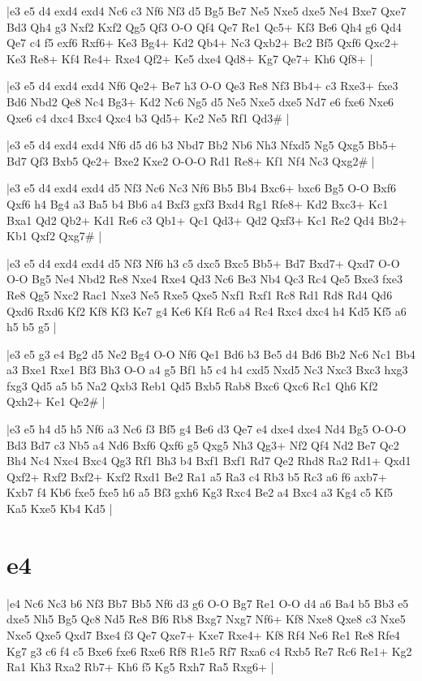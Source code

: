 \whitename{}
\blackname{}
\makegametitle
|e3 e5 d4 exd4 exd4 Nc6 c3 Nf6 Nf3 d5 Bg5 Be7 Ne5 Nxe5 dxe5 Ne4 Bxe7 Qxe7 Bd3 Qh4 g3 Nxf2 Kxf2 Qg5 Qf3 O-O Qf4 Qe7 Re1 Qc5+ Kf3 Be6 Qh4 g6 Qd4 Qe7 c4 f5 exf6 Rxf6+ Ke3 Bg4+ Kd2 Qb4+ Nc3 Qxb2+ Bc2 Bf5 Qxf6 Qxc2+ Ke3 Re8+ Kf4 Re4+ Rxe4 Qf2+ Ke5 dxe4 Qd8+ Kg7 Qe7+ Kh6 Qf8+  |

\whitename{}
\blackname{}
\makegametitle
|e3 e5 d4 exd4 exd4 Nf6 Qe2+ Be7 h3 O-O Qe3 Re8 Nf3 Bb4+ c3 Rxe3+ fxe3 Bd6 Nbd2 Qe8 Nc4 Bg3+ Kd2 Nc6 Ng5 d5 Ne5 Nxe5 dxe5 Nd7 e6 fxe6 Nxe6 Qxe6 c4 dxc4 Bxc4 Qxc4 b3 Qd5+ Ke2 Ne5 Rf1 Qd3\#  |

\whitename{}
\blackname{}
\makegametitle
|e3 e5 d4 exd4 exd4 Nf6 d5 d6 b3 Nbd7 Bb2 Nb6 Nh3 Nfxd5 Ng5 Qxg5 Bb5+ Bd7 Qf3 Bxb5 Qe2+ Bxe2 Kxe2 O-O-O Rd1 Re8+ Kf1 Nf4 Nc3 Qxg2\#  |

\whitename{}
\blackname{}
\makegametitle
|e3 e5 d4 exd4 exd4 d5 Nf3 Nc6 Nc3 Nf6 Bb5 Bb4 Bxc6+ bxc6 Bg5 O-O Bxf6 Qxf6 h4 Bg4 a3 Ba5 b4 Bb6 a4 Bxf3 gxf3 Bxd4 Rg1 Rfe8+ Kd2 Bxc3+ Kc1 Bxa1 Qd2 Qb2+ Kd1 Re6 c3 Qb1+ Qc1 Qd3+ Qd2 Qxf3+ Kc1 Re2 Qd4 Bb2+ Kb1 Qxf2 Qxg7\#  |

\whitename{}
\blackname{}
\makegametitle
|e3 e5 d4 exd4 exd4 d5 Nf3 Nf6 h3 c5 dxc5 Bxc5 Bb5+ Bd7 Bxd7+ Qxd7 O-O O-O Bg5 Ne4 Nbd2 Re8 Nxe4 Rxe4 Qd3 Nc6 Be3 Nb4 Qc3 Rc4 Qe5 Bxe3 fxe3 Re8 Qg5 Nxc2 Rac1 Nxe3 Ne5 Rxe5 Qxe5 Nxf1 Rxf1 Rc8 Rd1 Rd8 Rd4 Qd6 Qxd6 Rxd6 Kf2 Kf8 Kf3 Ke7 g4 Ke6 Kf4 Rc6 a4 Rc4 Rxc4 dxc4 h4 Kd5 Kf5 a6 h5 b5 g5  |

\whitename{}
\blackname{}
\makegametitle
|e3 e5 g3 e4 Bg2 d5 Ne2 Bg4 O-O Nf6 Qe1 Bd6 b3 Be5 d4 Bd6 Bb2 Nc6 Nc1 Bb4 a3 Bxe1 Rxe1 Bf3 Bh3 O-O a4 g5 Bf1 h5 c4 h4 cxd5 Nxd5 Nc3 Nxc3 Bxc3 hxg3 fxg3 Qd5 a5 b5 Na2 Qxb3 Reb1 Qd5 Bxb5 Rab8 Bxc6 Qxc6 Rc1 Qh6 Kf2 Qxh2+ Ke1 Qe2\#  |

\whitename{}
\blackname{}
\makegametitle
|e3 e5 h4 d5 h5 Nf6 a3 Nc6 f3 Bf5 g4 Be6 d3 Qe7 e4 dxe4 dxe4 Nd4 Bg5 O-O-O Bd3 Bd7 c3 Nb5 a4 Nd6 Bxf6 Qxf6 g5 Qxg5 Nh3 Qg3+ Nf2 Qf4 Nd2 Be7 Qc2 Bh4 Nc4 Nxc4 Bxc4 Qg3 Rf1 Bh3 b4 Bxf1 Bxf1 Rd7 Qe2 Rhd8 Ra2 Rd1+ Qxd1 Qxf2+ Rxf2 Bxf2+ Kxf2 Rxd1 Be2 Ra1 a5 Ra3 c4 Rb3 b5 Rc3 a6 f6 axb7+ Kxb7 f4 Kb6 fxe5 fxe5 h6 a5 Bf3 gxh6 Kg3 Rxc4 Be2 a4 Bxc4 a3 Kg4 c5 Kf5 Ka5 Kxe5 Kb4 Kd5  |

\section{e4}

\whitename{}
\blackname{}
\makegametitle
|e4 Nc6 Nc3 b6 Nf3 Bb7 Bb5 Nf6 d3 g6 O-O Bg7 Re1 O-O d4 a6 Ba4 b5 Bb3 e5 dxe5 Nh5 Bg5 Qc8 Nd5 Re8 Bf6 Rb8 Bxg7 Nxg7 Nf6+ Kf8 Nxe8 Qxe8 c3 Nxe5 Nxe5 Qxe5 Qxd7 Bxe4 f3 Qe7 Qxe7+ Kxe7 Rxe4+ Kf8 Rf4 Ne6 Re1 Re8 Rfe4 Kg7 g3 c6 f4 c5 Bxe6 fxe6 Rxe6 Rf8 R1e5 Rf7 Rxa6 c4 Rxb5 Re7 Rc6 Re1+ Kg2 Ra1 Kh3 Rxa2 Rb7+ Kh6 f5 Kg5 Rxh7 Ra5 Rxg6+  |

